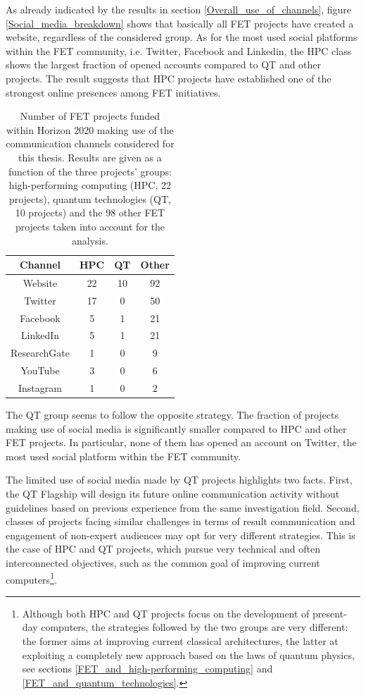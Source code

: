 As already indicated by the results in section \ref{Overall_use_of_channels}, figure \ref{Social_media_breakdown} shows that basically all FET projects have created a website, regardless of the considered group. As for the most used social platforms within the FET community, i.e. Twitter, Facebook and Linkedin, the HPC class shows the largest fraction of opened accounts compared to QT and other projects. The result suggests that HPC projects have established one of the strongest online presences among FET initiatives.  

\begin{table}[t]
 \begin{center}
 {\footnotesize
  \begin{tabular}{cccc}
   \hline 
   \hline
   Channel & HPC & QT & Other \\ 
   \hline
   \hline
   Website & 22 & 10 & 92 \\
   Twitter & 17 & 0 & 50 \\
   Facebook & 5 & 1 & 21 \\
   LinkedIn & 5 & 1 & 21 \\
   ResearchGate & 1 & 0 & 9 \\
   YouTube & 3 & 0 & 6 \\
   Instagram & 1 & 0 & 2 \\
   \hline
   \hline
  \end{tabular}
 }
 \end{center} 
 \caption{Number of FET projects funded within Horizon 2020 making use of the communication channels considered for this thesis. Results are given as a function of the three projects' groups: high-performing computing (HPC, 22 projects), quantum technologies (QT, 10 projects) and the 98 other FET projects taken into account for the analysis.}
\label{Social_media_breakdown_table} 
\end{table}

The QT group seems to follow the opposite strategy. The fraction of projects making use of social media is significantly smaller compared to HPC and other FET projects. In particular, none of them has opened an account on Twitter, the most used social platform within the FET community. 

The limited use of social media made by QT projects highlights two facts. First, the QT Flagship will design its future online communication activity without guidelines based on previous experience from the same investigation field. Second, classes of projects facing similar challenges in terms of result communication and engagement of non-expert audiences may opt for very different strategies. This is the case of HPC and QT projects, which pursue very technical and often interconnected objectives, such as the common goal of improving current computers\footnote{Although both HPC and QT projects focus on the development of present-day computers, the strategies followed by the two groups are very different: the former aims at improving current classical architectures, the latter at exploiting a completely new approach based on the laws of quantum physics, see sections \ref{FET_and_high-performing_computing} and \ref{FET_and_quantum_technologies}.}.

